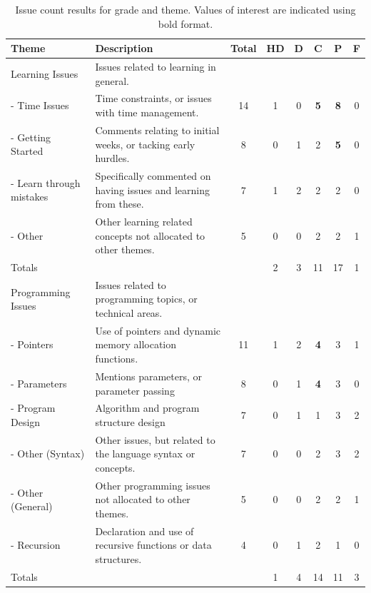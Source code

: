 \begin{table}[htbp]
	  \footnotesize
	  \renewcommand{\arraystretch}{1.3}
	
	\caption{Issue count results for grade and theme. Values of interest are indicated using bold format.}
	\label{tbl:theme_counts}
	\centering
	
    \begin{tabular}{l|p{5cm}|c|c|c|c|c|c}
        Theme                  & Description & Total & HD & D & C  & P  & F \\ \hline \hline
        Learning Issues        & Issues related to learning in general. &&&&& \\ %
        - Time Issues            & Time constraints, or issues with time management.           & 14    & 1  & 0 & \textbf{5}  & \textbf{8}  & 0 \\ %
        - Getting Started        & Comments relating to initial weeks, or tacking early hurdles.            & 8     & 0  & 1 & 2  & \textbf{5}  & 0 \\ %
        - Learn through mistakes & Specifically commented on having issues and learning from these.           & 7     & 1  & 2 & 2  & 2  & 0 \\ %
        - Other                  & Other learning related concepts not allocated to other themes.           & 5     & 0  & 0 & 2  & 2  & 1 \\ \hline
        Totals        & ~           & ~    & 2  & 3 & 11 & 17 & 1 \\ \hline \hline
        Programming Issues     & Issues related to programming topics, or technical areas.           & ~    & ~  & ~ & ~ & ~ & ~ \\ %
        - Pointers               & Use of pointers and dynamic memory allocation functions.            & 11    & 1  & 2 & \textbf{4}  & 3  & 1 \\ %
        - Parameters             & Mentions parameters, or parameter passing           & 8     & 0  & 1 & \textbf{4}  & 3  & 0 \\ %
        - Program Design         & Algorithm and program structure design           & 7     & 0  & 1 & 1  & 3  & 2 \\ %
        - Other (Syntax)           & Other issues, but related to the language syntax or concepts.           & 7    & 0  & 0 & 2  & 3  & 2 \\ %
        - Other (General)                  & Other programming issues not allocated to other themes.           & 5    & 0  & 0 & 2  & 2  & 1 \\ %
        - Recursion              & Declaration and use of recursive functions or data structures.           & 4    & 0  & 1 & 2  & 1  & 0 \\ \hline
        Totals     & ~           & ~    & 1  & 4 & 14 & 11 & 3 \\ %
        
	\end{tabular}	
\end{table}

